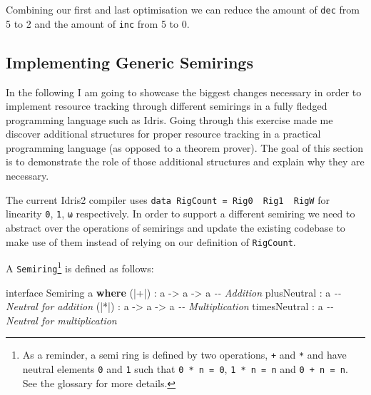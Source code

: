 \documentclass[
]{article}
\newenvironment{Shaded}{}{}
\newcommand{\CommentTok}[1]{\textcolor[rgb]{0.38,0.63,0.69}{\textit{#1}}}
\newcommand{\DataTypeTok}[1]{\textcolor[rgb]{0.56,0.13,0.00}{#1}}
\newcommand{\KeywordTok}[1]{\textcolor[rgb]{0.00,0.44,0.13}{\textbf{#1}}}
\newcommand{\NormalTok}[1]{#1}
\newcommand{\OperatorTok}[1]{\textcolor[rgb]{0.40,0.40,0.40}{#1}}
\newcommand{\OtherTok}[1]{\textcolor[rgb]{0.00,0.44,0.13}{#1}}
\begin{document}
Combining our first and last optimisation we can reduce the amount of
\texttt{dec} from 5 to 2 and the amount of \texttt{inc} from 5 to 0.

\hypertarget{implementing-generic-semirings}{%
\subsection{Implementing Generic
Semirings}\label{implementing-generic-semirings}}

In the following I am going to showcase the biggest changes necessary in
order to implement resource tracking through different semirings in a
fully fledged programming language such as Idris. Going through this
exercise made me discover additional structures for proper resource
tracking in a practical programming language (as opposed to a theorem
prover). The goal of this section is to demonstrate the role of those
additional structures and explain why they are necessary.

The current Idris2 compiler uses
\texttt{data\ RigCount\ =\ Rig0\ \textbar{}\ Rig1\ \textbar{}\ RigW} for
linearity \texttt{0}, \texttt{1}, \texttt{ω} respectively. In order to
support a different semiring we need to abstract over the operations of
semirings and update the existing codebase to make use of them instead
of relying on our definition of \texttt{RigCount}.

A \texttt{Semiring}\footnote{As a reminder, a semi ring is defined by
  two operations, \texttt{+} and \texttt{*} and have neutral elements
  \texttt{0} and \texttt{1} such that \texttt{0\ *\ n\ =\ 0},
  \texttt{1\ *\ n\ =\ n} and \texttt{0\ +\ n\ =\ n}. See the glossary
  for more details.} is defined as follows:

\begin{Shaded}
\begin{Highlighting}[]
\NormalTok{interface }\DataTypeTok{Semiring}\NormalTok{ a }\KeywordTok{where}
\NormalTok{  (}\OperatorTok{|+|}\NormalTok{) }\OperatorTok{:}\NormalTok{ a }\OtherTok{{-}\textgreater{}}\NormalTok{ a }\OtherTok{{-}\textgreater{}}\NormalTok{ a }\CommentTok{{-}{-} Addition}
\NormalTok{  plusNeutral }\OperatorTok{:}\NormalTok{ a     }\CommentTok{{-}{-} Neutral for addition}
\NormalTok{  (}\OperatorTok{|*|}\NormalTok{) }\OperatorTok{:}\NormalTok{ a }\OtherTok{{-}\textgreater{}}\NormalTok{ a }\OtherTok{{-}\textgreater{}}\NormalTok{ a }\CommentTok{{-}{-} Multiplication}
\NormalTok{  timesNeutral }\OperatorTok{:}\NormalTok{ a    }\CommentTok{{-}{-} Neutral for multiplication}
\end{Highlighting}
\end{Shaded}
\end{document}
